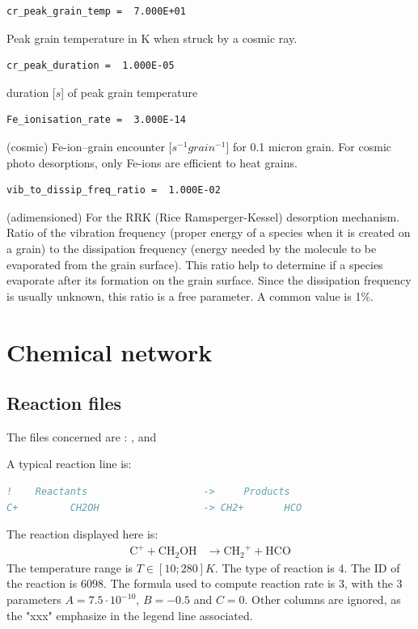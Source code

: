 \documentclass[english,a4paper,twoside]{article}
\begin{document}
\begin{verbatim}
cr_peak_grain_temp =  7.000E+01
\end{verbatim}
Peak grain temperature in K when struck by a cosmic ray.

\begin{verbatim}
cr_peak_duration =  1.000E-05
\end{verbatim}
duration [$\unit{s}$] of peak grain temperature

\begin{verbatim}
Fe_ionisation_rate =  3.000E-14
\end{verbatim}
(cosmic) Fe-ion--grain encounter [$\unit{s^{-1} grain^{-1}}$] for 0.1 micron grain. For cosmic photo desorptions, only Fe-ions are efficient to heat grains. 

\begin{verbatim}
vib_to_dissip_freq_ratio =  1.000E-02
\end{verbatim}
(adimensioned) For the RRK (Rice Ramsperger-Kessel) desorption mechanism. Ratio of the vibration frequency (proper energy of a species when it is created on a grain) to the dissipation frequency (energy needed by the molecule to be evaporated from the grain surface). This ratio help to determine if a species evaporate after its formation on the grain surface. Since the dissipation frequency is usually unknown, this ratio is a free parameter. A common value is 1\%.

\section{Chemical network}
\subsection{Reaction files}
The files concerned are : ,  and 

A typical reaction line is:
\begin{lstlisting}[language=Fortran]
!    Reactants                    ->     Products                                                A          B          C      xxxxxxxxxxxxxxxxxxxxx ITYPE Tmin   Tmax formula ID xxxxx
C+         CH2OH                  -> CH2+       HCO                                           7.500E-10 -5.000E-01  0.000E+00 0.00e+00 0.00e+00   NA  4     10    280  3  6098 1  1
\end{lstlisting}
The reaction displayed here is:
\begin{align*}
\mathrm{C^+} + \mathrm{CH_2OH} &\rightarrow \mathrm{CH_2}^+ + \mathrm{HCO}
\end{align*}
The temperature range is $T\in[10;280]\unit{K}$. The type of reaction is $4$. The ID of the reaction is $6098$. The formula used to compute reaction rate is $3$, with the 3 parameters $A=7.5\cdot 10^{-10}$, $B=-0.5$ and $C=0$. Other columns are ignored, as the "xxx" emphasize in the legend line associated.
\end{document}
